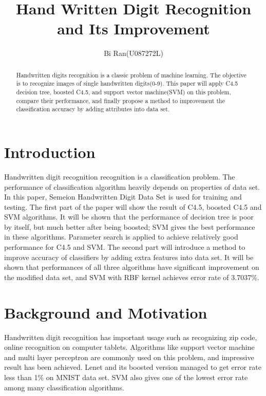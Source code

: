 \documentclass[a4paper,11pt]{article}
\author{Bi Ran(U087272L)}
\title{Hand Written Digit Recognition and Its Improvement}
\begin{document}
\maketitle
\begin{abstract}
Handwritten digits recognition is a classic problem of machine learning. The objective is to recognize images of single handwritten digits(0-9). This paper will apply C4.5 decision tree, boosted C4.5, and support vector machine(SVM) on this problem, compare their performance, and finally propose a method to improvement the classification accuracy by adding attributes into data set.
\end{abstract}
\section{Introduction}
Handwritten digit recognition recognition is a classification problem. The performance of classification algorithm heavily depends on properties of data set.
In this paper, Semeion Handwritten Digit Data Set is used for training and testing. The first part of the paper will show the result of C4.5, boosted C4.5 and SVM algorithms.
It will be shown that the performance of decision tree is poor by itself, but much better after being boosted; SVM gives the best performance in these algorithms. Parameter search is applied to achieve relatively good performance for C4.5 and SVM.
The second part will introduce a method to improve accuracy of classifiers by adding extra features into data set. It will be shown that performances of all three algorithms have significant improvement on the modified data set, and SVM with RBF kernel achieves error rate of 3.7037\%.
\section{Background and Motivation}
Handwritten digit recognition has important usage such as recognizing zip code, online recognition on computer tablets. Algorithms like support vector machine and multi layer perceptron are commonly used on this problem, and impressive result has been achieved. Lenet and its boosted version managed to get error rate less than 1\% on MNIST data set\cite{Kussul_improvedmethod}. SVM also gives one of the lowest error rate among many classification algorithms.
\end{document}
